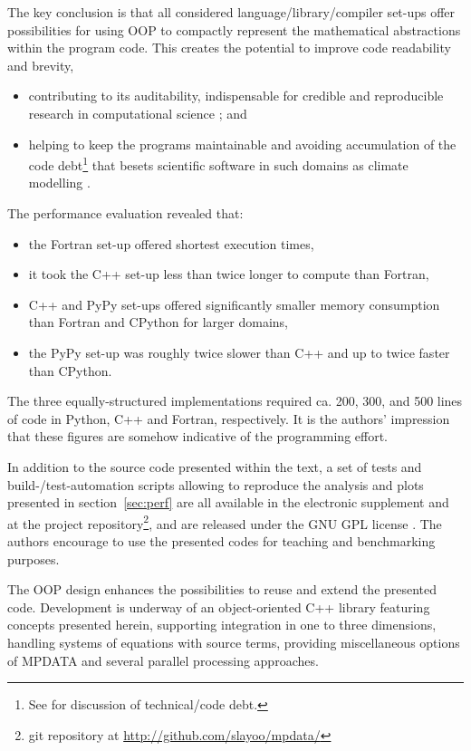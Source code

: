 \documentclass[twocolumn]{article}
\begin{document}
  The key conclusion is that all considered language/library/compiler
    set-ups offer possibilities for using OOP to compactly 
    represent the mathematical abstractions within the program code. 
  This creates the potential to improve code readability and brevity,
  \begin{itemize}
    \item{contributing to its 
      auditability, indispensable for credible and reproducible research in computational science 
      \citep{Post_et_al_2005, Merali_et_al_2010, Stodden_et_al_2012}; and
    }
    \item{helping to keep the programs maintainable and avoiding accumulation of the code 
      debt\footnote{See \citet{Buschmann_2011} for discussion of technical/code debt.} 
      that besets scientific software in such domains as climate modelling
      \citep{Freeman_et_al_2010}.
    }
  \end{itemize}
  \noindent 
  The performance evaluation revealed that:
    \begin{itemize}
      \item{the Fortran set-up offered shortest execution times,}
      \item{it took the C++ set-up less than twice longer to compute than Fortran,}
      \item{C++ and PyPy set-ups offered significantly smaller memory consumption 
        than Fortran and CPython for larger domains,}
      \item{the PyPy set-up was roughly twice slower than C++ and up to twice faster than CPython.}
    \end{itemize}
  The three equally-structured implementations required ca. 200, 300, and 500 lines of code 
    in Python, C++ and Fortran, respectively.  
  It is the authors' impression that these figures are somehow indicative of the programming 
    effort.

  In addition to the source code presented within the text,
    a set of tests and build-/test-automation scripts
    allowing to reproduce the analysis and plots presented in section~\ref{sec:perf} are all 
    available in the electronic supplement and at
    the project repository\footnote{git repository at \url{http://github.com/slayoo/mpdata/}},
    and are released under the GNU GPL license \citep{GPLv3}.
  The authors encourage to use the presented codes for teaching and benchmarking purposes.

  The OOP design enhances the possibilities to reuse and extend the presented code.
  Development is underway of an object-oriented C++ library featuring concepts presented herein,
    supporting integration in one to three dimensions, handling systems of equations with source terms, 
    providing miscellaneous options of MPDATA and several parallel processing approaches.
\end{document}
